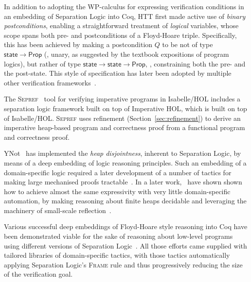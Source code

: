 In addition to adopting the WP-calculus for expressing verification
conditions in an embedding of Separation Logic into Coq, HTT first
made active use of \emph{binary postconditions}, enabling a
straightforward treatment of \emph{logical} variables, whose scope
spans both pre- and postconditions of a Floyd-Hoare
triple. Specifically, this has been achieved by making a postcondition
$Q$ to be not of type $\mathsf{state} \to \mathsf{Prop}$ (\ie, unary,
as suggested by the textbook expositions of program logics), but
rather of type $\mathsf{state} \to \mathsf{state} \to \mathsf{Prop}$,
\ie, constraining both the pre- and the post-state.
%
This style of specification has later been adopted by multiple other
verification frameworks~\citep{Swierstra:TPHOLS09,Swamy-al:PLDI13}.
%

The \textsc{Sepref}~\citep{lammich2015refinement} tool
for verifying imperative programs in Isabelle/HOL includes a separation logic
framework built on top of Imperative HOL, which is built on top of Isabelle/HOL.
\textsc{Sepref} uses refinement (Section~\ref{sec:refinement}) to derive an imperative heap-based program and
correctness proof from a functional program and correctness proof.

YNot~\citep{Nanevski2008} has implemented the \emph{heap disjointness},
inherent to Separation Logic, by means of a deep embedding of logic
reasoning principles.
%
Such an embedding of a domain-specific logic required a later
development of a number of tactics for making large mechanised proofs
tractable~\citep{Chlipala-al:ICFP09}.
%
In a later work,~\cite{Nanevski-al:POPL10} have shown shown how to
achieve almost the same expressivity with very little domain-specific
automation, by making reasoning about finite heaps decidable and
leveraging the machinery of small-scale
reflection~\citep{Gonthier2010}.

Various successful deep embeddings of Floyd-Hoare style reasoning into
Coq have been demonstrated viable for the sake of reasoning about
low-level programs using different versions of Separation
Logic~\citep{Chlipala-al:ICFP09,Chlipala:PLDI11,Chlipala2013,Chen2015,Cao2018}.
%
All those efforts came supplied with tailored libraries of
domain-specific tactics, with those tactics automatically
applying Separation Logic's \textsc{Frame} rule and thus progressively
reducing the size of the verification goal.




